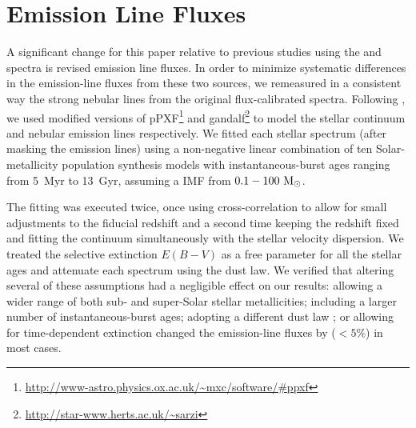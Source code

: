 \documentclass[preprint]{aastex61}
\begin{document}

\section{Emission Line Fluxes}
\label{sec:emflux}

A significant change for this paper relative to previous studies using the \citet{mou06} and \citet{mou10} spectra is revised emission line fluxes. In order to minimize systematic differences in the emission-line fluxes from these two sources, we remeasured in a consistent way the strong nebular lines from the original flux-calibrated spectra. Following \citet{mou11}, we used modified versions of pPXF\footnote{\url{http://www-astro.physics.ox.ac.uk/~mxc/software/\#ppxf}} \citep{cap04} and {\sc gandalf}\footnote{\url{http://star-www.herts.ac.uk/~sarzi}} \citep{sar06} to model the stellar continuum and nebular emission lines respectively.  We fitted each stellar spectrum (after masking the emission lines) using a non-negative linear combination of ten Solar-metallicity \citet{bc03} population synthesis models with instantaneous-burst ages ranging from 5~Myr to 13~Gyr, assuming a \citet{cha03} IMF from $0.1-100~{\rm M_\odot}$.  

The fitting was executed twice, once using cross-correlation to allow for small adjustments to the fiducial redshift and a second time keeping the redshift fixed and fitting the continuum simultaneously with the stellar velocity dispersion.  We treated the selective extinction $E(B-V)$ as a free parameter for all the stellar ages and attenuate each spectrum using the \citet{cal00} dust law.  We verified that altering several of these assumptions had a negligible effect on our results: allowing a wider range of both sub- and super-Solar stellar metallicities; including a larger number of instantaneous-burst ages; adopting a different dust law \citep[e.g.,][]{odo94}; or allowing for time-dependent extinction \citep[e.g.,][]{cha00} changed the emission-line fluxes by ($<5\%$) in most cases.
\end{document}

